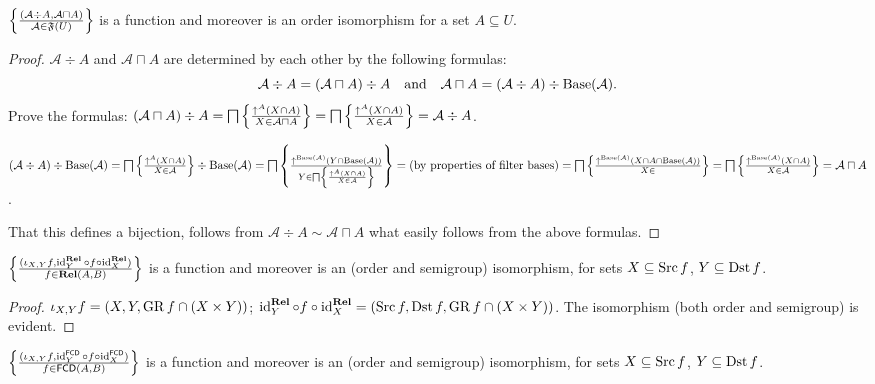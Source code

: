 \begin{prop}
  $\left\{ \frac{ (\mathcal{A} \div A , \mathcal{A} \sqcap A) }{
  \mathcal{A} \in \mathfrak{F} (U) }\right\}$ is a function and
  moreover is an order isomorphism for a set $A \subseteq U$.
\end{prop}

\begin{proof}
  $\mathcal{A} \div A$ and $\mathcal{A} \sqcap A$ are determined by each other
  by the following formulas:
  \[ \mathcal{A} \div A = (\mathcal{A} \sqcap A) \div A \quad
     \text{and} \quad \mathcal{A} \sqcap A = (\mathcal{A} \div A) \div
     \operatorname{Base} (\mathcal{A}) . \]
  Prove the formulas: $(\mathcal{A} \sqcap A) \div A = \bigsqcap \left\{ \frac{
  \uparrow^A (X \cap A) }{ X \in \mathcal{A} \sqcap A
  }\right\} = \bigsqcap \left\{ \frac{ \uparrow^A (X \cap A) }{
  X \in \mathcal{A} }\right\} = \mathcal{A} \div A$.
  
  $(\mathcal{A} \div A) \div \operatorname{Base} (\mathcal{A}) = \bigsqcap \left\{ \frac{
  \uparrow^A (X \cap A) }{ X \in \mathcal{A} }\right\}
  \div \operatorname{Base} (\mathcal{A}) = \bigsqcap \left\{ \frac{ \uparrow^{\operatorname{Base}
  (\mathcal{A})} (Y \cap \operatorname{Base} (\mathcal{A})) }{
  Y \in \bigsqcap \left\{ \frac{ \uparrow^A (X \cap A) }{
  X \in \mathcal{A} }\right\} }\right\} = \text{(by properties of
  filter bases)} = \bigsqcap \left\{ \frac{ \uparrow^{\operatorname{Base} (\mathcal{A})} (X
  \cap A \cap \operatorname{Base} (\mathcal{A})) }{ X \in
  }\right\} = \bigsqcap \left\{ \frac{ \uparrow^{\operatorname{Base}
  (\mathcal{A})} (X \cap A) }{ X \in \mathcal{A}
  }\right\} = \mathcal{A} \sqcap A$.
  
  That this defines a bijection, follows from $\mathcal{A} \div A \sim
  \mathcal{A} \sqcap A$ what easily follows from the above formulas.
\end{proof}

\begin{prop}
  $\left\{ \frac{ (\iota_{X, Y} f , \operatorname{id}^{\mathbf{Rel}}_Y \circ f \circ
  \operatorname{id}^{\mathbf{Rel}}_X) }{ f \in
  \mathbf{Rel} (A , B) }\right\}$ is a function and moreover is an
  (order and semigroup) isomorphism, for sets $X \subseteq \operatorname{Src} f$, $Y
  \subseteq \operatorname{Dst} f$.
\end{prop}

\begin{proof}
  $\iota_{X, Y} f = (X , Y , \operatorname{GR} f \cap (X \times Y))$;
  $\operatorname{id}^{\mathbf{Rel}}_Y \circ f \circ
  \operatorname{id}^{\mathbf{Rel}}_X = (\operatorname{Src} f , \operatorname{Dst} f ,
  \operatorname{GR} f \cap (X \times Y))$. The isomorphism (both order and semigroup)
  is evident.
\end{proof}

\begin{prop}
  $\left\{ \frac{ (\iota_{X, Y} f , \operatorname{id}^{\mathsf{FCD}}_Y
  \circ f \circ \operatorname{id}^{\mathsf{FCD}}_X) }{
  f \in \mathsf{FCD} (A , B) }\right\}$ is a function and moreover is an
  (order and semigroup) isomorphism, for sets $X \subseteq \operatorname{Src} f$, $Y
  \subseteq \operatorname{Dst} f$.
\end{prop}

